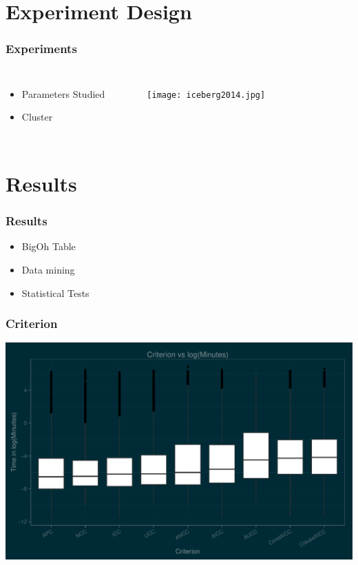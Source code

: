 \documentclass[hyperref]{beamer}
\begin{document}
    \section{Experiment Design}
      \begin{frame}
        \frametitle{Experiments}
        \begin{columns}
        \begin{itemize}
          \item Parameters Studied
          \item Cluster
        \end{itemize}
          \begin{figure}
            \texttt{[image: iceberg2014.jpg]}
          \end{figure}
      \end{columns}
      \end{frame}

    \section{Results}
      \begin{frame}
        \frametitle{Results}
        \begin{itemize}
          \item BigOh Table
          \item Data mining
          \item Statistical Tests
        \end{itemize}
      \end{frame}

      \begin{frame}
        \frametitle{Criterion}
        \includegraphics[width=\textwidth]{CriterionBox}
      \end{frame}
\end{document}
